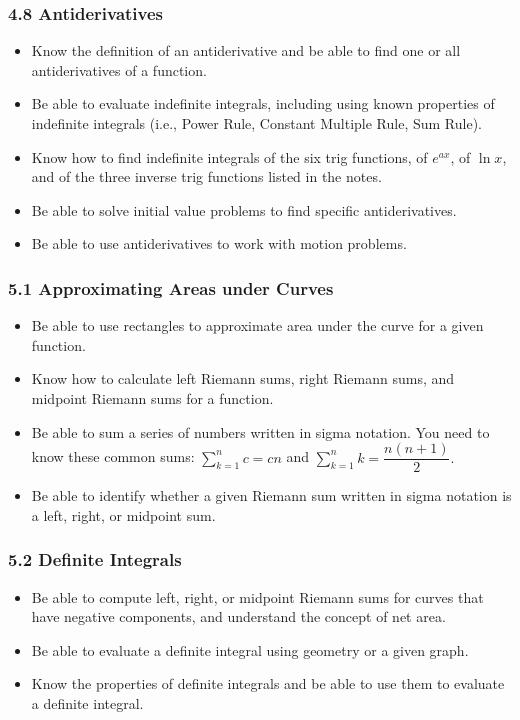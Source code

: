 \documentclass[14pt]{beamer}
\newcommand{\dsum}{\displaystyle\sum}
\begin{document}
\begin{frame}
\frametitle{4.8 Antiderivatives}
\footnotesize
\begin{itemize}
\item Know the definition of an antiderivative and be able to find one or all antiderivatives of a function.
\item Be able to evaluate indefinite integrals, including using known properties of indefinite integrals (i.e., Power Rule, Constant Multiple Rule, Sum Rule).
\item Know how to find indefinite integrals of the six trig functions, of $e^{ax}$, of $\ln x$, and of the three inverse trig functions listed in the notes.
\item Be able to solve initial value problems to find specific antiderivatives.
\item Be able to use antiderivatives to work with motion problems.
\end{itemize}
\end{frame}

\begin{frame}
\frametitle{5.1 Approximating Areas under Curves}
\small
\begin{itemize}
\item Be able to use rectangles to approximate area under the curve for a given function.
\item Know how to calculate left Riemann sums, right Riemann sums, and midpoint Riemann sums for a function.
\item Be able to sum a series of numbers written in sigma notation.  You need to know these common sums:  $\dsum_{k=1}^n c = cn$ and $\dsum_{k=1}^n k = \dfrac{n(n+1)}{2}.$
\item Be able to identify whether a given Riemann sum written in sigma notation is a left, right, or midpoint sum.
\end{itemize}
\end{frame}

\begin{frame}
\frametitle{5.2  Definite Integrals}
\begin{itemize}
\item Be able to compute left, right, or midpoint Riemann sums for curves that have negative components, and understand the concept of net area.
\item Be able to evaluate a definite integral using geometry or a given graph.
\item Know the properties of definite integrals and be able to use them to evaluate a definite integral.
\end{itemize}
\end{frame}
\end{document}
